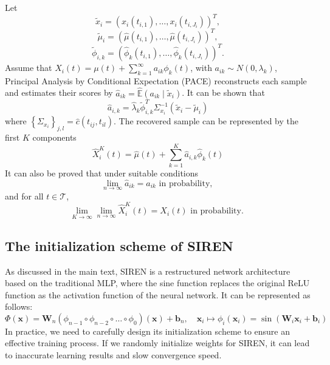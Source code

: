 \documentclass{article}
\begin{document}
Let 
$$\tilde{x}_i=\left(x_i\left(t_{i, 1}\right), \ldots, x_i\left(t_{i, J_i}\right)\right)^T, $$
$$\tilde{\mu}_i=\left(\widehat{\mu}\left(t_{i, 1}\right), \ldots, \widehat{\mu}\left(t_{i, J_i}\right)\right)^T, $$ 
$$\tilde{\phi}_{i, k}=\left(\widehat{\phi}_k\left(t_{i, 1}\right), \ldots, \widehat{\phi}_k\left(t_{i, J_i}\right)\right)^T.$$
Assume that $X_i(t)=\mu(t)+\sum_{k=1}^{\infty} a_{i k} \phi_k(t)$, with $a_{i k} \sim N\left(0, \lambda_k\right)$,
Principal Analysis by Conditional Expectation (PACE) reconstructs each sample and estimates their scores by $\widehat{a}_{i k}=\hat{\mathbb{E}}\left(a_{i k} \mid \tilde{x}_i\right)$.
It can be shown that 
$$
\widehat{a}_{i, k}=\widehat{\lambda}_k \tilde{\phi}_{i, k}^T \Sigma_{x_i}^{-1}\left(\tilde{x}_i-\tilde{\mu}_i\right)
$$
where $\left\{\Sigma_{x_i}\right\}_{j, l}=\widehat{c}\left(t_{ij}, t_{il}\right)$.
The recovered sample can be represented by the first $K$ components 
$$\widehat{X}_i^K(t)=\widehat{\mu}(t)+\sum_{k=1}^K \widehat{a}_{i, k} \widehat{\phi}_k(t)$$
It can also be proved \cite{yao2005functional}  that under suitable conditions
$$
\lim _{n \rightarrow \infty} \hat{a}_{i k}={a}_{i k} \text { in probability, }
$$
and for all $t \in \mathcal{T}$,
$$
\lim _{K \rightarrow \infty} \lim _{n \rightarrow \infty} \widehat{X}_i^K(t)={X}_i(t) \text { in probability. }
$$


\subsection{The initialization scheme of SIREN \cite{sitzmann2020implicit}}
\label{SIREN}

As discussed in the main text, SIREN is a restructured network architecture based on the traditional MLP, 
where the sine function replaces the original ReLU function as the activation function of the neural network. 
It can be represented as follows:
$$
\Phi(\mathbf{x})=\mathbf{W}_n\left(\phi_{n-1} \circ \phi_{n-2} \circ \ldots \circ \phi_0\right)(\mathbf{x})+\mathbf{b}_n, \quad \mathbf{x}_i \mapsto \phi_i\left(\mathbf{x}_i\right)=\sin \left(\mathbf{W}_i \mathbf{x}_i+\mathbf{b}_i\right)
$$
In practice, we need to carefully design its initialization scheme to ensure an effective training process. 
If we randomly initialize weights for SIREN, it can lead to inaccurate learning results and slow convergence speed.
\end{document}
